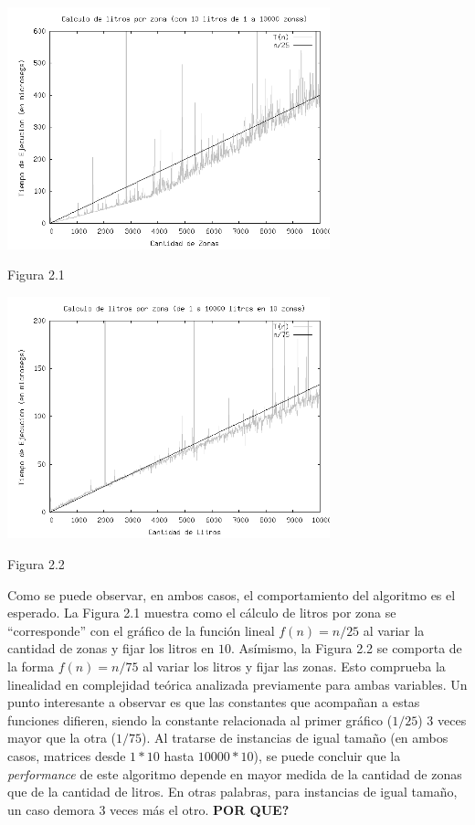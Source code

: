 \documentclass[a4paper,11pt] {article}
\begin{document}
\begin{center}
 \includegraphics[width=0.7\textwidth]{Plots/Tp2Ej1-TiemposLitrosPorZonaPorZonas-10litros-bw.png}
\begin{center}
Figura 2.1
\end{center}
 \includegraphics[width=0.7\textwidth]{Plots/Tp2Ej1-TiemposLitrosPorZonaPorZonas-10zonas-bw.png}
\begin{center}
Figura 2.2
\end{center}
\end{center}

Como se puede observar, en ambos casos, el comportamiento del algoritmo es el esperado. La Figura 2.1 muestra como el cálculo de litros por zona se ``corresponde'' con el gráfico de la función lineal $f(n) = n/25$ al variar la cantidad de zonas y fijar los litros en $10$. Asímismo, la Figura 2.2 se comporta de la forma $f(n) = n/75$ al variar los litros y fijar las zonas. Esto comprueba la linealidad en complejidad teórica analizada previamente para ambas variables. Un punto interesante a observar es que las constantes que acompañan a estas funciones difieren, siendo la constante relacionada al primer gráfico ($1/25$) 3 veces mayor que la otra ($1/75$). Al tratarse de instancias de igual tamaño (en ambos casos, matrices desde $1*10$ hasta $10000*10$), se puede concluir que la \textit{performance} de este algoritmo depende en mayor medida de la cantidad de zonas que de la cantidad de litros. En otras palabras, para instancias de igual tamaño, un caso demora 3 veces más el otro. \textbf{POR QUE?}
\end{document}
